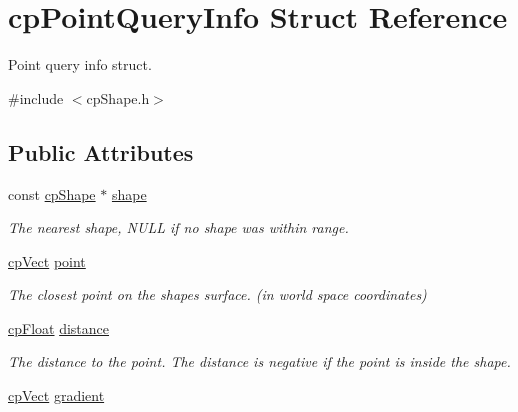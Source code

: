 \hypertarget{structcp_point_query_info}{}\section{cp\+Point\+Query\+Info Struct Reference}
\label{structcp_point_query_info}


Point query info struct.  




{\ttfamily \#include $<$cp\+Shape.\+h$>$}

\subsection*{Public Attributes}
\begin{DoxyCompactItemize}
\item 
\mbox{\label{structcp_point_query_info_ad27c172fcc5ca586f60c4e9fc15560da}} 
const \mbox{\hyperlink{structcp_shape}{cp\+Shape}} $\ast$ \mbox{\hyperlink{structcp_point_query_info_ad27c172fcc5ca586f60c4e9fc15560da}{shape}}
\begin{DoxyCompactList}\small\item\em The nearest shape, N\+U\+LL if no shape was within range. \end{DoxyCompactList}\item 
\mbox{\label{structcp_point_query_info_aa3ba52f53251ad8770c39d7789b14547}} 
\mbox{\hyperlink{structcp_vect}{cp\+Vect}} \mbox{\hyperlink{structcp_point_query_info_aa3ba52f53251ad8770c39d7789b14547}{point}}
\begin{DoxyCompactList}\small\item\em The closest point on the shape\textquotesingle{}s surface. (in world space coordinates) \end{DoxyCompactList}\item 
\mbox{\label{structcp_point_query_info_ab7b002bf19b83cb05dd4635f92884ec8}} 
\mbox{\hyperlink{group__basic_types_gac1ed65573e035bf892505768c852d8d3}{cp\+Float}} \mbox{\hyperlink{structcp_point_query_info_ab7b002bf19b83cb05dd4635f92884ec8}{distance}}
\begin{DoxyCompactList}\small\item\em The distance to the point. The distance is negative if the point is inside the shape. \end{DoxyCompactList}\item 
\mbox{\hyperlink{structcp_vect}{cp\+Vect}} \mbox{\hyperlink{structcp_point_query_info_a55bf2732bc2563af6c83ce1985906034}{gradient}}
\end{DoxyCompactItemize}


